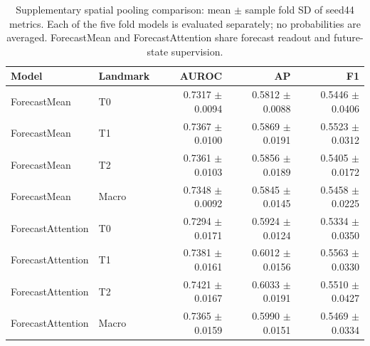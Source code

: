 \begin{table}[t]
\centering
\small
\caption{Supplementary spatial pooling comparison: mean $\pm$ sample fold SD of seed44 metrics. Each of the five fold models is evaluated separately; no probabilities are averaged. ForecastMean and ForecastAttention share forecast readout and future-state supervision.}
\label{tab:pooling}
\begin{tabular}{llrrr}
\toprule
Model & Landmark & AUROC & AP & F1 \\
\midrule
ForecastMean & T0 & 0.7317 $\pm$ 0.0094 & 0.5812 $\pm$ 0.0088 & 0.5446 $\pm$ 0.0406 \\
ForecastMean & T1 & 0.7367 $\pm$ 0.0100 & 0.5869 $\pm$ 0.0191 & 0.5523 $\pm$ 0.0312 \\
ForecastMean & T2 & 0.7361 $\pm$ 0.0103 & 0.5856 $\pm$ 0.0189 & 0.5405 $\pm$ 0.0172 \\
ForecastMean & Macro & 0.7348 $\pm$ 0.0092 & 0.5845 $\pm$ 0.0145 & 0.5458 $\pm$ 0.0225 \\
ForecastAttention & T0 & 0.7294 $\pm$ 0.0171 & 0.5924 $\pm$ 0.0124 & 0.5334 $\pm$ 0.0350 \\
ForecastAttention & T1 & 0.7381 $\pm$ 0.0161 & 0.6012 $\pm$ 0.0156 & 0.5563 $\pm$ 0.0330 \\
ForecastAttention & T2 & 0.7421 $\pm$ 0.0167 & 0.6033 $\pm$ 0.0191 & 0.5510 $\pm$ 0.0427 \\
ForecastAttention & Macro & 0.7365 $\pm$ 0.0159 & 0.5990 $\pm$ 0.0151 & 0.5469 $\pm$ 0.0334 \\
\bottomrule
\end{tabular}
\end{table}
